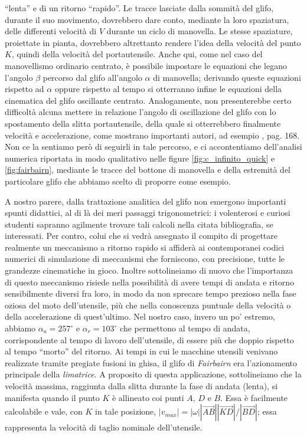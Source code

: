 ``lenta'' e di un ritorno ``rapido''.
Le tracce lasciate dalla sommit\`a del glifo, durante il suo movimento, dovrebbero dare
conto, mediante la loro spaziatura, delle differenti velocit\`a di $V$ durante
un ciclo di manovella. Le stesse spaziature, proiettate in pianta, dovrebbero
altrettanto rendere l'idea della velocit\`a del punto $K$, quindi della velocit\`a
del portautensile.
Anche qui, come nel caso del manovellismo ordinario centrato, \`e possibile
impostare le equazioni che legano l'angolo $\beta$ percorso dal glifo
all'angolo $\alpha$ di manovella;
derivando queste equazioni
rispetto ad $\alpha$ oppure rispetto al tempo si otterranno infine
le equazioni della cinematica del glifo oscillante centrato. Analogamente,
non presenterebbe certo difficolt\`a alcuna mettere
 in relazione l'angolo di oscillazione del glifo con lo spostamento
della slitta portautensile, della quale si otterrebbero finalmente
 velocit\`a e accelerazione, come mostrano
importanti autori, ad esempio \cite{hartog}, pag. 168.
Non ce la sentiamo per\`o di seguirli in tale percorso,
e ci accontentiamo dell'analisi numerica
riportata in modo qualitativo nelle figure
 \ref{fig:c_infinito_quick} e
 \ref{fig:fairbairn}, mediante le tracce del bottone di manovella
 e della estremit\`a del particolare glifo che abbiamo scelto di
proporre come esempio.

\noindent A nostro parere, dalla trattazione analitica del glifo
non emergono importanti spunti didattici,
al di l\`a dei meri passaggi trigonometrici:
i volenterosi e curiosi studenti
sapranno agilmente trovare tali calcoli nella citata bibliografia, se
interessati.
Per contro, colui che si vedr\`a assegnato il compito di progettare realmente
un meccanismo a ritorno rapido si affider\`a ai contemporanei codici numerici
di simulazione di meccanismi che  forniscono, con precisione, tutte le
grandezze cinematiche in gioco.
Inoltre sottolineiamo di nuovo che
 l'importanza di questo meccanismo risiede nella 
possibilit\`a di avere tempi di andata e ritorno sensibilmente diversi fra
loro, in modo da non sprecare tempo prezioso nella fase
oziosa del moto dell'utensile,
pi\`u che nella conoscenza puntuale della velocit\`a o della
accelerazione di quest'ultimo.
Nel nostro caso, invero un po' estremo,  abbiamo $\alpha_a=257^{\circ}$ e $\alpha_r=103^{\circ}$ che permettono
al tempo di andata, corrispondente al tempo di lavoro dell'utensile, di essere
pi\`u che doppio rispetto al tempo ``morto'' del ritorno.
Ai tempi in cui le macchine utensili venivano realizzate tramite pregiate
fusioni in ghisa, il glifo di {\em Fairbairn} era l'azionamento
principale della {\em limatrice}.
A proposito di questa applicazione, sottolineiamo che
la velocit\`a massima, raggiunta dalla slitta durante
la fase di andata (lenta), si manifesta quando il punto
$K$ \`e allineato coi punti $A$, $D$ e $B$. Essa \`e facilmente calcolabile
e vale, con $K$ in tale
posizione, $|v_{max}|=|\omega| |\overrightarrow{AB}||\overrightarrow{KD}|/|\overrightarrow{BD}|$; essa
rappresenta la velocit\`a  di taglio nominale dell'utensile.

